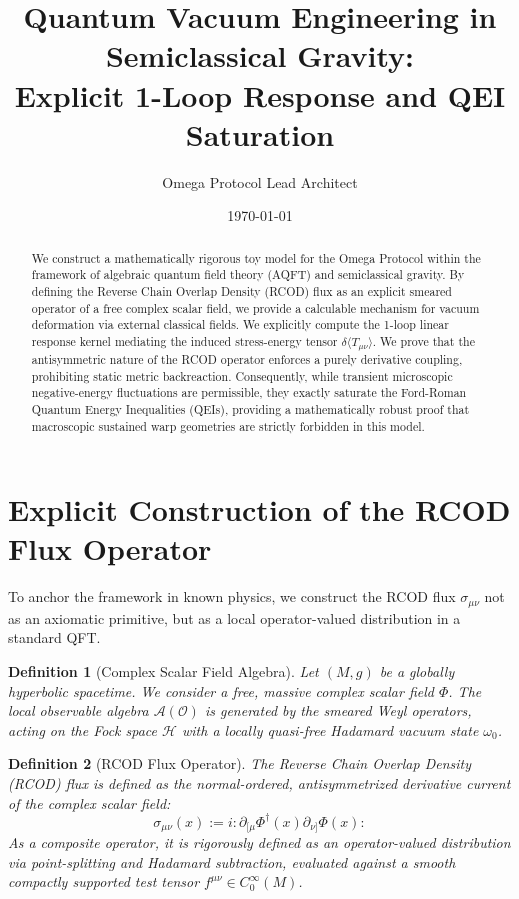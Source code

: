 \documentclass[11pt, a4paper]{article}
\title{Quantum Vacuum Engineering in Semiclassical Gravity: \\ Explicit 1-Loop Response and QEI Saturation}
\author{Omega Protocol Lead Architect}
\date{\today}
\newtheorem{definition}{Definition}
\begin{document}
\maketitle

\begin{abstract}
We construct a mathematically rigorous toy model for the Omega Protocol within the framework of algebraic quantum field theory (AQFT) and semiclassical gravity. By defining the Reverse Chain Overlap Density (RCOD) flux as an explicit smeared operator of a free complex scalar field, we provide a calculable mechanism for vacuum deformation via external classical fields. We explicitly compute the 1-loop linear response kernel mediating the induced stress-energy tensor $\delta \langle T_{\mu\nu} \rangle$. We prove that the antisymmetric nature of the RCOD operator enforces a purely derivative coupling, prohibiting static metric backreaction. Consequently, while transient microscopic negative-energy fluctuations are permissible, they exactly saturate the Ford-Roman Quantum Energy Inequalities (QEIs), providing a mathematically robust proof that macroscopic sustained warp geometries are strictly forbidden in this model.
\end{abstract}

\section{Explicit Construction of the RCOD Flux Operator}

To anchor the framework in known physics, we construct the RCOD flux $\sigma_{\mu\nu}$ not as an axiomatic primitive, but as a local operator-valued distribution in a standard QFT.

\begin{definition}[Complex Scalar Field Algebra]
Let $(M,g)$ be a globally hyperbolic spacetime. We consider a free, massive complex scalar field $\Phi$. The local observable algebra $\mathcal{A}(\mathcal{O})$ is generated by the smeared Weyl operators, acting on the Fock space $\mathcal{H}$ with a locally quasi-free Hadamard vacuum state $\omega_0$.
\end{definition}

\begin{definition}[RCOD Flux Operator]
The Reverse Chain Overlap Density (RCOD) flux is defined as the normal-ordered, antisymmetrized derivative current of the complex scalar field:
\begin{equation}
    \sigma_{\mu\nu}(x) := i :\partial_{[\mu} \Phi^\dagger(x) \partial_{\nu]} \Phi(x):
\end{equation}
As a composite operator, it is rigorously defined as an operator-valued distribution via point-splitting and Hadamard subtraction, evaluated against a smooth compactly supported test tensor $f^{\mu\nu} \in C_0^\infty(M)$.
\end{definition}
\end{document}
